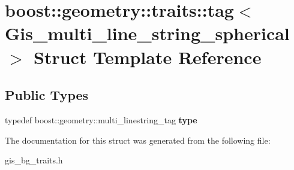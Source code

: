 \hypertarget{structboost_1_1geometry_1_1traits_1_1tag_3_01Gis__multi__line__string__spherical_01_4}{}\section{boost\+:\+:geometry\+:\+:traits\+:\+:tag$<$ Gis\+\_\+multi\+\_\+line\+\_\+string\+\_\+spherical $>$ Struct Template Reference}
\label{structboost_1_1geometry_1_1traits_1_1tag_3_01Gis__multi__line__string__spherical_01_4}
\subsection*{Public Types}
\begin{DoxyCompactItemize}
\item 
\mbox{\label{structboost_1_1geometry_1_1traits_1_1tag_3_01Gis__multi__line__string__spherical_01_4_a509f0968c36348eb68fdbad9a1959a6a}} 
typedef boost\+::geometry\+::multi\+\_\+linestring\+\_\+tag {\bfseries type}
\end{DoxyCompactItemize}


The documentation for this struct was generated from the following file\+:\begin{DoxyCompactItemize}
\item 
gis\+\_\+bg\+\_\+traits.\+h\end{DoxyCompactItemize}
